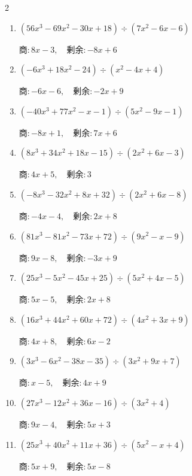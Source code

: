 \begin{multicols}{2}
\begin{enumerate}
  \item $(56x^{3}-69x^{2}-30x+18) \div (7x^{2}-6x-6)$

        $商 : 8x-3, \quad 剰余 : -8x+6$

\columnbreak %

\resetques

  \item $(-6x^{3}+18x^{2}-24) \div (x^{2}-4x+4)$

        $商 : -6x-6, \quad 剰余 : -2x+9$

  \item $(-40x^{3}+77x^{2}-x-1) \div (5x^{2}-9x-1)$

        $商 : -8x+1, \quad 剰余 : 7x+6$

  \item $(8x^{3}+34x^{2}+18x-15) \div (2x^{2}+6x-3)$

        $商 : 4x+5, \quad 剰余 : 3$

  \item $(-8x^{3}-32x^{2}+8x+32) \div (2x^{2}+6x-8)$

        $商 : -4x-4, \quad 剰余 : 2x+8$

  \item $(81x^{3}-81x^{2}-73x+72) \div (9x^{2}-x-9)$

        $商 : 9x-8, \quad 剰余 : -3x+9$

\columnbreak %

  \item $(25x^{3}-5x^{2}-45x+25) \div (5x^{2}+4x-5)$

        $商 : 5x-5, \quad 剰余 : 2x+8$

  \item $(16x^{3}+44x^{2}+60x+72) \div (4x^{2}+3x+9)$

        $商 : 4x+8, \quad 剰余 : 6x-2$

  \item $(3x^{3}-6x^{2}-38x-35) \div (3x^{2}+9x+7)$

        $商 : x-5, \quad 剰余 : 4x+9$

  \item $(27x^{3}-12x^{2}+36x-16) \div (3x^{2}+4)$

        $商 : 9x-4, \quad 剰余 : 5x+3$

  \item $(25x^{3}+40x^{2}+11x+36) \div (5x^{2}-x+4)$

        $商 : 5x+9, \quad 剰余 : 5x-8$

\columnbreak %

\resetques


\end{enumerate}
\end{multicols}
